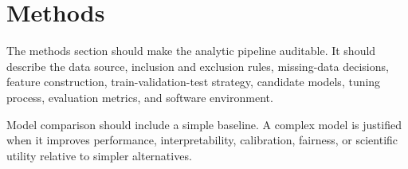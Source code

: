 \section{Methods}

The methods section should make the analytic pipeline auditable. It should describe the data source, inclusion and exclusion rules, missing-data decisions, feature construction, train-validation-test strategy, candidate models, tuning process, evaluation metrics, and software environment.

Model comparison should include a simple baseline. A complex model is justified when it improves performance, interpretability, calibration, fairness, or scientific utility relative to simpler alternatives.
